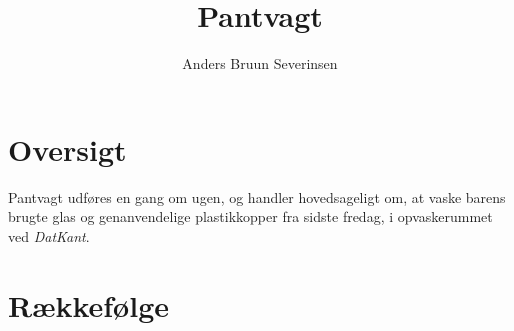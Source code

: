 

\title{Pantvagt}
\date{}
\author{Anders Bruun Severinsen}



\maketitle

\section{Oversigt}
\label{sec:oversigt}

Pantvagt udføres en gang om ugen, og handler hovedsageligt om, at
vaske barens brugte glas og genanvendelige plastikkopper fra sidste fredag,
i opvaskerummet ved \textit{DatKant}.

\section{Rækkefølge}
\label{sec:rakkefolge}

